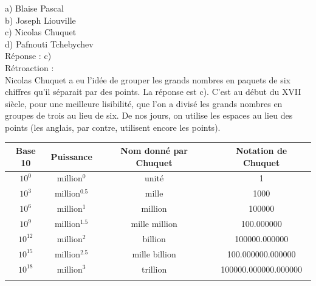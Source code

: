 \documentclass[letterpaper, 12pt]{article}
\begin{document}
a) Blaise Pascal\\
b) Joseph Liouville\\
c) Nicolas Chuquet\\
d) Pafnouti Tchebychev\\

R\'eponse : c)\\

R\'etroaction :\\
Nicolas Chuquet a eu l'id\'ee de grouper les grands nombres en paquets de six chiffres qu'il s\'eparait par des points. La r\'eponse est c). C'est au d\'ebut du {\scriptsize XVII\ieme{}} si\`ecle, pour une meilleure lisibilit\'e, que l'on a divis\'e les grands nombres en groupes de trois au lieu de six. De nos jours, on utilise les espaces au lieu des points (les anglais, par contre, utilisent encore les points).\\
\begin{center}
\begin{tabular}{|c|c|c|c|} \hline
{\bf Base 10} & {\bf Puissance} & {\bf Nom donn\'e par Chuquet} & {\bf Notation de Chuquet} \\ \hline \hline
$10^{0}$ & million$^{0}$ & unit\'e & 1\\[1mm] \hline
$10^{3}$ & million$^{0.5}$ & mille & 1000\\[1mm] \hline
$10^{6}$ & million$^{1}$ & million & 100000\\[1mm] \hline
$10^{9}$ & million$^{1.5}$ & mille million & 100.000000\\[1mm] \hline
$10^{12}$ & million$^{2}$ & billion & 100000.000000\\[1mm] \hline
$10^{15}$ & million$^{2.5}$ & mille billion & 100.000000.000000\\[1mm] \hline
$10^{18}$ & million$^{3}$ & trillion & 100000.000000.000000\\[1mm] \hline
\multicolumn{4}{c}{}\\
\end{tabular}\\
\end{center}
\end{document}
